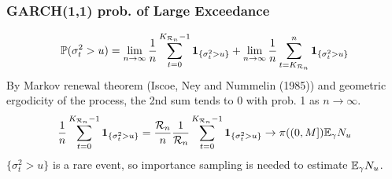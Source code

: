 \documentclass{beamer}
\begin{document}
\begin{frame}
  \frametitle{GARCH(1,1) prob. of Large Exceedance}
  \[
  \mathbb{P}(\sigma_t^2 > u) =
  \lim_{n \to \infty} {1 \over n} \sum_{t=0}^{K_{\mathcal R_n} - 1} \mathbf{1}_{\{\sigma_t^2 > u\}}
  +
  \lim_{n \to \infty} {1 \over n}\sum_{t=K_{\mathcal R_n}}^{n} \mathbf{1}_{\{\sigma_t^2 > u\}}
  \]
  By Markov renewal theorem (Iscoe, Ney and Nummelin (1985)) and
  geometric ergodicity of the process, the 2nd sum tends to 0 with
  prob. 1 as $n \to \infty$.
  \[
  {1 \over n} \sum_{t=0}^{K_{\mathcal R_n} - 1} \mathbf{1}_{\{\sigma_t^2 > u\}}
  = {\mathcal R_n \over n} {1 \over \mathcal R_n}
  \sum_{t=0}^{K_{\mathcal R_n} - 1} \mathbf{1}_{\{\sigma_t^2 > u\}}
  \to \pi((0, M]) \mathbb{E}_\gamma N_u
  \]
  $\{\sigma_t^2 > u\}$ is a rare event, so importance sampling is needed to
  estimate $\mathbb{E}_\gamma N_u$.
\end{frame}
\end{document}
